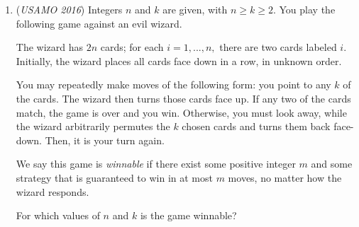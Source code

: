 \begin{enumerate}
	\item (\textit{USAMO 2016}) Integers $n$ and $k$ are given, with $n\ge k\ge 2.$ You play the following game against an evil wizard.


 The wizard has $2n$ cards; for each $i = 1, ..., n,$ there are two cards labeled $i.$ Initially, the wizard places all cards face down in a row, in unknown order.


 You may repeatedly make moves of the following form: you point to any $k$ of the cards. The wizard then turns those cards face up. If any two of the cards match, the game is over and you win. Otherwise, you must look away, while the wizard arbitrarily permutes the $k$ chosen cards and turns them back face-down. Then, it is your turn again.


 We say this game is \textit{winnable} if there exist some positive integer $m$ and some strategy that is guaranteed to win in at most $m$ moves, no matter how the wizard responds.


 For which values of $n$ and $k$ is the game winnable?


 

\end{enumerate}